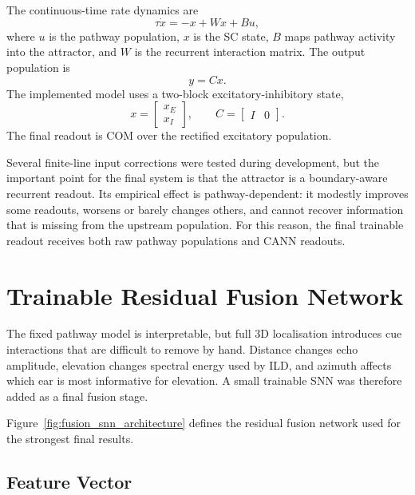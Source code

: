 The continuous-time rate dynamics are
\begin{equation}
    \tau\dot{x} = -x + Wx + Bu,
\end{equation}
where $u$ is the pathway population, $x$ is the SC state, $B$ maps pathway activity into the attractor, and $W$ is the recurrent interaction matrix. The output population is
\begin{equation}
    y=Cx.
\end{equation}
The implemented model uses a two-block excitatory-inhibitory state,
\begin{equation}
    x=
    \begin{bmatrix}
        x_E\\
        x_I
    \end{bmatrix},
    \qquad
    C=\begin{bmatrix}I&0\end{bmatrix}.
\end{equation}
The final readout is COM over the rectified excitatory population.

Several finite-line input corrections were tested during development, but the important point for the final system is that the attractor is a boundary-aware recurrent readout. Its empirical effect is pathway-dependent: it modestly improves some readouts, worsens or barely changes others, and cannot recover information that is missing from the upstream population. For this reason, the final trainable readout receives both raw pathway populations and CANN readouts.

\section{Trainable Residual Fusion Network}

The fixed pathway model is interpretable, but full 3D localisation introduces cue interactions that are difficult to remove by hand. Distance changes echo amplitude, elevation changes spectral energy used by ILD, and azimuth affects which ear is most informative for elevation. A small trainable SNN was therefore added as a final fusion stage.



Figure~\ref{fig:fusion_snn_architecture} defines the residual fusion network used for the strongest final results.

\subsection{Feature Vector}

